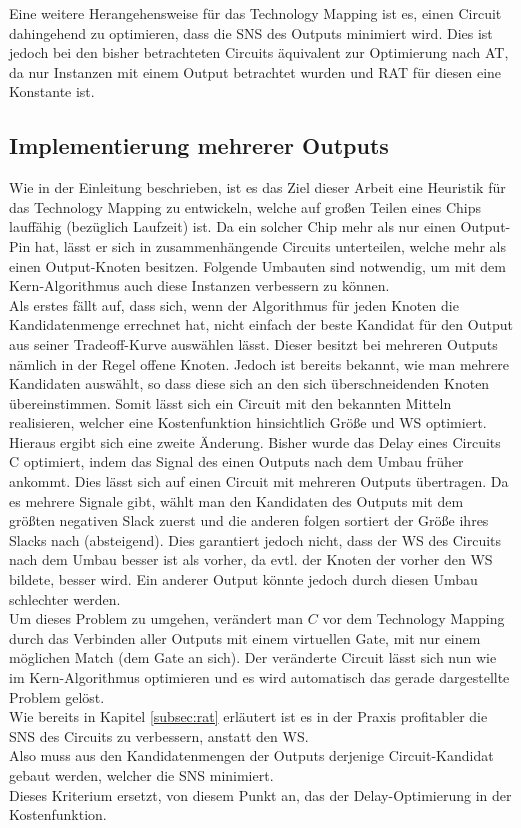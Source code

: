 \documentclass[11pt, a4paper, german]{article}
\newcommand{\TM}{Technology  Mapping }
\begin{document}
Eine weitere Herangehensweise für das \TM ist es, einen Circuit dahingehend zu optimieren, dass die SNS des Outputs minimiert wird. Dies ist jedoch bei den bisher betrachteten Circuits äquivalent zur Optimierung nach AT, da nur Instanzen mit einem Output betrachtet wurden und RAT für diesen eine Konstante ist.

\subsection{Implementierung mehrerer Outputs}
\label{subsec:mehrere_outputs}
Wie in der Einleitung beschrieben, ist es das Ziel dieser Arbeit eine Heuristik für das \TM zu entwickeln, welche auf großen Teilen eines Chips lauffähig (bezüglich Laufzeit) ist. Da ein solcher Chip mehr als nur einen Output-Pin hat, lässt er sich in zusammenhängende Circuits unterteilen, welche mehr als einen Output-Knoten besitzen. Folgende Umbauten sind notwendig, um mit dem Kern-Algorithmus auch diese Instanzen verbessern zu können.\\

Als erstes fällt auf, dass sich, wenn der Algorithmus für jeden Knoten die Kandidatenmenge errechnet hat, nicht einfach der beste Kandidat für den Output aus seiner Tradeoff-Kurve auswählen lässt. Dieser besitzt bei mehreren Outputs nämlich in der Regel offene Knoten. 
Jedoch ist bereits bekannt, wie man mehrere Kandidaten auswählt, so dass diese sich an den sich überschneidenden Knoten übereinstimmen. Somit lässt sich ein Circuit mit den bekannten Mitteln realisieren, welcher eine Kostenfunktion hinsichtlich Größe und WS optimiert. \\

Hieraus ergibt sich eine zweite Änderung. Bisher wurde das Delay eines Circuits C optimiert, indem das Signal des einen Outputs nach dem Umbau früher ankommt. Dies lässt sich auf einen Circuit mit mehreren Outputs übertragen. Da es mehrere Signale gibt, wählt man den Kandidaten des Outputs mit dem größten negativen Slack zuerst und die anderen folgen sortiert der Größe ihres Slacks nach (absteigend). Dies garantiert jedoch nicht, dass der WS des Circuits nach dem Umbau besser ist als vorher, da evtl. der Knoten der vorher den WS bildete, besser wird. Ein anderer Output könnte jedoch durch diesen Umbau schlechter werden. \\
Um dieses Problem zu umgehen, verändert man $C$ vor dem \TM durch das Verbinden aller Outputs mit einem virtuellen Gate, mit nur einem möglichen Match (dem Gate an sich). Der veränderte Circuit lässt sich nun wie im Kern-Algorithmus optimieren und es wird automatisch das gerade dargestellte Problem gelöst.\\ 
Wie bereits in Kapitel \ref{subsec:rat}  erläutert ist es in der Praxis profitabler die SNS des Circuits zu verbessern, anstatt den WS.\\
Also muss aus den Kandidatenmengen der Outputs derjenige Circuit-Kandidat gebaut werden, welcher die SNS minimiert.\\
 Dieses Kriterium ersetzt, von diesem Punkt an,  das der Delay-Optimierung in der Kostenfunktion.\\
 
\end{document}
